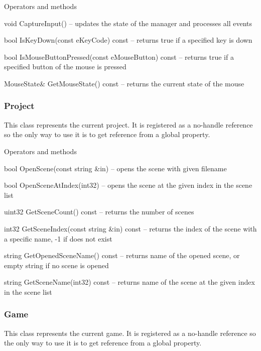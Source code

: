 \begin{titled-itemize}{Operators and methods}
  \item void CaptureInput() -- updates the state of the manager and processes all events
  \item bool IsKeyDown(const eKeyCode) const -- returns true if a specified key is down
  \item bool IsMouseButtonPressed(const eMouseButton) const -- returns true if a specified button of the mouse is pressed
  \item MouseState\& GetMouseState() const -- returns the current state of the mouse
\end{titled-itemize}

\subsubsection{Project}

This class represents the current project. It is registered as a no-handle reference so the only way to use it is to get reference from a global property.

\begin{titled-itemize}{Operators and methods}
  \item bool OpenScene(const string \&in) -- opens the scene with given filename
  \item bool OpenSceneAtIndex(int32) -- opens the scene at the given index in the scene list
  \item uint32 GetSceneCount() const -- returns the number of scenes
  \item int32 GetSceneIndex(const string \&in) const -- returns the index of the scene with a specific name, -1 if does not exist
  \item string GetOpenedSceneName() const -- returns name of the opened scene, or empty string if no scene is opened
  \item string GetSceneName(int32) const -- returns name of the scene at the given index in the scene list
\end{titled-itemize}

\subsubsection{Game}

This class represents the current game. It is registered as a no-handle reference so the only way to use it is to get reference from a global property.

